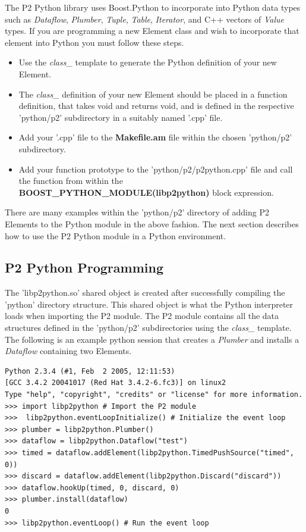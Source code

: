 \documentclass[12pt]{article}
\begin{document}
The P2 Python library uses Boost.Python to incorporate into Python data types such
as \emph{Dataflow}, \emph{Plumber}, \emph{Tuple}, \emph{Table}, 
\emph{Iterator}, and C++ vectors of \emph{Value} types. If you are programming a
new Element class and wish to incorporate that element into Python you must follow
these steps.
\begin{itemize}
\item Use the \emph{class\_} template to generate the Python definition of your new Element.
\item The \emph{class\_} definition of your new Element should be placed in 
a function definition, that takes void and returns void, and is defined in the respective 
'python/p2' subdirectory in a suitably named '.cpp' file.
\item Add your '.cpp' file to the {\bf Makefile.am} file within the chosen 'python/p2' 
subdirectory.
\item Add your function prototype to the 'python/p2/p2python.cpp' file and call the
function from within the {\bf BOOST\_PYTHON\_MODULE(libp2python)} block
expression.
\end{itemize}
There are many examples within the 'python/p2' directory of adding P2 Elements 
to the Python module in the above fashion. The next section describes how to use
the P2 Python module in a Python environment.

\subsection{P2 Python Programming}

The 'libp2python.so' shared object is created after successfully compiling the 
'python' directory structure. This shared object is what the Python interpreter loads
when importing the P2 module. The P2 module contains all the data structures
defined in the 'python/p2' subdirectories using the \emph{class\_} template. The
following is an example python session that creates a \emph{Plumber} and installs
 a \emph{Dataflow} containing two Elements.
 
\begin{verbatim}
Python 2.3.4 (#1, Feb  2 2005, 12:11:53) 
[GCC 3.4.2 20041017 (Red Hat 3.4.2-6.fc3)] on linux2
Type "help", "copyright", "credits" or "license" for more information.
>>> import libp2python # Import the P2 module
>>>  libp2python.eventLoopInitialize() # Initialize the event loop
>>> plumber = libp2python.Plumber()
>>> dataflow = libp2python.Dataflow("test")
>>> timed = dataflow.addElement(libp2python.TimedPushSource("timed", 0))
>>> discard = dataflow.addElement(libp2python.Discard("discard"))
>>> dataflow.hookUp(timed, 0, discard, 0)
>>> plumber.install(dataflow)
0
>>> libp2python.eventLoop() # Run the event loop
\end{verbatim}
\end{document}
